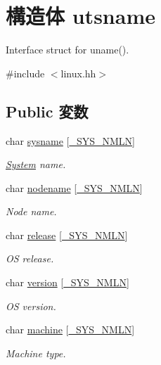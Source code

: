 \hypertarget{structLinux_1_1utsname}{
\section{構造体 utsname}
\label{structLinux_1_1utsname}
}


Interface struct for uname().  


{\ttfamily \#include $<$linux.hh$>$}\subsection*{Public 変数}
\begin{DoxyCompactItemize}
\item 
char \hyperlink{structLinux_1_1utsname_a2deb62088193f0a1a1c7169961ef9417}{sysname} \mbox{[}\hyperlink{classLinux_a1a19d4c9718c9a4ad5fa2e48271fccc9}{\_\-SYS\_\-NMLN}\mbox{]}
\begin{DoxyCompactList}\small\item\em \hyperlink{classSystem}{System} name. \item\end{DoxyCompactList}\item 
char \hyperlink{structLinux_1_1utsname_a3e8872e682806e061de2b1ee07bc75f3}{nodename} \mbox{[}\hyperlink{classLinux_a1a19d4c9718c9a4ad5fa2e48271fccc9}{\_\-SYS\_\-NMLN}\mbox{]}
\begin{DoxyCompactList}\small\item\em Node name. \item\end{DoxyCompactList}\item 
char \hyperlink{structLinux_1_1utsname_a4015ecb9ca3fd601ff8b8961eda3e7e2}{release} \mbox{[}\hyperlink{classLinux_a1a19d4c9718c9a4ad5fa2e48271fccc9}{\_\-SYS\_\-NMLN}\mbox{]}
\begin{DoxyCompactList}\small\item\em OS release. \item\end{DoxyCompactList}\item 
char \hyperlink{structLinux_1_1utsname_a1e88526d3e96aa25d88df1541dafe922}{version} \mbox{[}\hyperlink{classLinux_a1a19d4c9718c9a4ad5fa2e48271fccc9}{\_\-SYS\_\-NMLN}\mbox{]}
\begin{DoxyCompactList}\small\item\em OS version. \item\end{DoxyCompactList}\item 
char \hyperlink{structLinux_1_1utsname_a0687759450f1b8396e8e9415abe4b867}{machine} \mbox{[}\hyperlink{classLinux_a1a19d4c9718c9a4ad5fa2e48271fccc9}{\_\-SYS\_\-NMLN}\mbox{]}
\begin{DoxyCompactList}\small\item\em Machine type. \item\end{DoxyCompactList}\end{DoxyCompactItemize}


